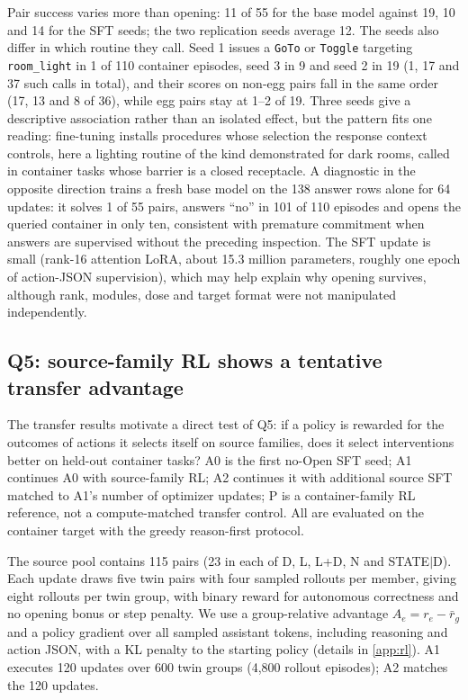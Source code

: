 \documentclass{article}
\begin{document}
Pair success varies more than opening: 11 of 55 for the base model against 19, 10 and 14 for the SFT seeds; the two replication seeds average 12. The seeds also differ in which routine they call. Seed 1 issues a \texttt{GoTo} or \texttt{Toggle} targeting \texttt{room\_light} in 1 of 110 container episodes, seed 3 in 9 and seed 2 in 19 (1, 17 and 37 such calls in total), and their scores on non-egg pairs fall in the same order (17, 13 and 8 of 36), while egg pairs stay at 1--2 of 19. Three seeds give a descriptive association rather than an isolated effect, but the pattern fits one reading: fine-tuning installs procedures whose selection the response context controls, here a lighting routine of the kind demonstrated for dark rooms, called in container tasks whose barrier is a closed receptacle. A diagnostic in the opposite direction trains a fresh base model on the 138 answer rows alone for 64 updates: it solves 1 of 55 pairs, answers ``no'' in 101 of 110 episodes and opens the queried container in only ten, consistent with premature commitment when answers are supervised without the preceding inspection. The SFT update is small (rank-16 attention LoRA, about 15.3 million parameters, roughly one epoch of action-JSON supervision), which may help explain why opening survives, although rank, modules, dose and target format were not manipulated independently.

\subsection{Q5: source-family RL shows a tentative transfer advantage}
\label{sec:rl}
The transfer results motivate a direct test of Q5: if a policy is rewarded for the outcomes of actions it selects itself on source families, does it select interventions better on held-out container tasks? A0 is the first no-Open SFT seed; A1 continues A0 with source-family RL; A2 continues it with additional source SFT matched to A1's number of optimizer updates; P is a container-family RL reference, not a compute-matched transfer control. All are evaluated on the container target with the greedy reason-first protocol.

The source pool contains 115 pairs (23 in each of D, L, L+D, N and STATE$|$D). Each update draws five twin pairs with four sampled rollouts per member, giving eight rollouts per twin group, with binary reward for autonomous correctness and no opening bonus or step penalty. We use a group-relative advantage $A_e = r_e - \bar r_g$ and a policy gradient over all sampled assistant tokens, including reasoning and action JSON, with a KL penalty to the starting policy (details in \cref{app:rl}). A1 executes 120 updates over 600 twin groups (4,800 rollout episodes); A2 matches the 120 updates.
\end{document}
